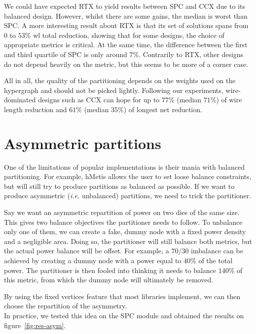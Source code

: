 \documentclass[11pt,a4paper]{report} %
\theoremstyle{customdef}
\begin{document}
We could have expected RTX to yield results between SPC and CCX due to its balanced design.
However, whilst there are some gains, the median is worst than SPC.
A more interesting result about RTX is that its set of solutions spans from $0$ to $53\%$ \gls{wl} total reduction, showing that for some designs, the choice of appropriate metrics is critical.
At the same time, the difference between the first and third quartile of SPC is only around $7\%$.
Contrarily to RTX, other designs do not depend heavily on the metric, but this seems to be more of a corner case.

All in all, the quality of the partitioning depends on the weights used on the hypergraph and should not be picked lightly.
Following our experiments, wire-dominated designs such as CCX can hope for up to $77\%$ (median $71\%$) of wire length reduction and $61\%$ (median $35\%$) of longest net reduction.




\section{Asymmetric partitions}\label{sec:asym-part}
One of the limitations of popular implementations is their mania with balanced partitioning.
For example, hMetis allows the user to set loose balance constraints, but will still try to produce partitions as balanced as possible.
If we want to produce asymmetric (\textit{i.e.} unbalanced) partitions, we need to trick the partitioner.

Say we want an asymmetric repartition of power on two dies of the same size.
This gives two balance objectives the partitioner needs to follow.
To unbalance only one of them, we can create a fake, dummy node with a fixed power density and a negligible area.
Doing so, the partitioner will still balance both metrics, but the actual power balance will be offset.
For example, a $70/30$ imbalance can be achieved by creating a dummy node with a power equal to $40\%$ of the total power.
The partitioner is then fooled into thinking it needs to balance $140\%$ of this metric, from which the dummy node will ultimately be removed.

By using the fixed vertices feature that most libraries implement, we can then choose the repartition of the asymmetry.\\

In practice, we tested this idea on the SPC module and obtained the results on figure~\ref{fig:res-asym}.
\end{document}
